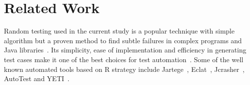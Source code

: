 \documentclass[conference]{IEEEtran}
\begin{document}










\section{Related Work}\label{sec:rw}

\noindent Random testing used in the current study is a popular technique with simple algorithm but a proven method to find subtle failures in complex programs and Java libraries~\cite{Pacheco2005, Csallner2004}. Its simplicity, ease of implementation and efficiency in generating test cases make it one of the best choices for test automation~\cite{Hamlet1994}. Some of the well known automated tools based on R strategy include Jartege~\cite{Oriat2004}, Eclat~\cite{Pacheco2005}, Jcrasher~\cite{Csallner2004}, AutoTest \cite{Leitner2007} and YETI~\cite{Oriol2012}.

\end{document}
